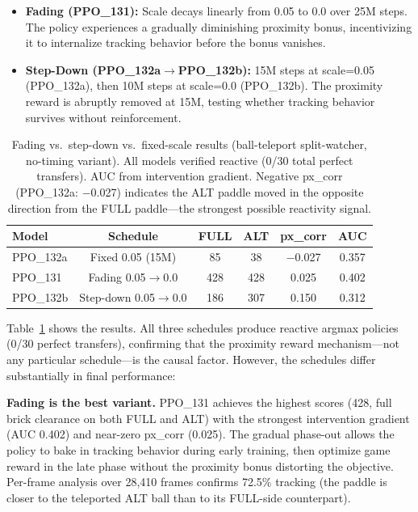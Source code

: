 \documentclass[11pt]{article}
\begin{document}
\begin{itemize}
    \item \textbf{Fading (PPO\_131):} Scale decays linearly from 0.05 to 0.0
    over 25M steps. The policy experiences a gradually diminishing proximity
    bonus, incentivizing it to internalize tracking behavior before the bonus
    vanishes.

    \item \textbf{Step-Down (PPO\_132a$\rightarrow$PPO\_132b):} 15M steps at
    scale=0.05 (PPO\_132a), then 10M steps at scale=0.0 (PPO\_132b). The
    proximity reward is abruptly removed at 15M, testing whether tracking
    behavior survives without reinforcement.
\end{itemize}

\begin{table}[ht]
\centering
\begin{tabular}{lccccc}
\toprule
\textbf{Model} & \textbf{Schedule} & \textbf{FULL} & \textbf{ALT} &
\textbf{px\_corr} & \textbf{AUC} \\
\midrule
PPO\_132a & Fixed 0.05 (15M)      & 85  & 38  & $-$0.027 & 0.357 \\
PPO\_131  & Fading 0.05$\to$0.0  & 428 & 428 & 0.025    & 0.402 \\
PPO\_132b & Step-down 0.05$\to$0.0& 186 & 307 & 0.150    & 0.312 \\
\bottomrule
\end{tabular}
\caption{Fading vs.\ step-down vs.\ fixed-scale results (ball-teleport
split-watcher, no-timing variant). All models verified reactive (0/30 total
perfect transfers). AUC from intervention gradient. Negative px\_corr
(PPO\_132a: $-$0.027) indicates the ALT paddle moved in the opposite direction
from the FULL paddle---the strongest possible reactivity signal.}
\label{tab:fading}
\end{table}

Table~\ref{tab:fading} shows the results. All three schedules produce reactive
argmax policies (0/30 perfect transfers), confirming that the proximity reward
mechanism---not any particular schedule---is the causal factor. However, the
schedules differ substantially in final performance:

\textbf{Fading is the best variant.} PPO\_131 achieves the highest scores (428,
full brick clearance on both FULL and ALT) with the strongest intervention
gradient (AUC 0.402) and near-zero px\_corr (0.025). The gradual phase-out
allows the policy to bake in tracking behavior during early training, then
optimize game reward in the late phase without the proximity bonus distorting
the objective. Per-frame analysis over 28,410 frames confirms 72.5\% tracking
(the paddle is closer to the teleported ALT ball than to its FULL-side
counterpart).
\end{document}
